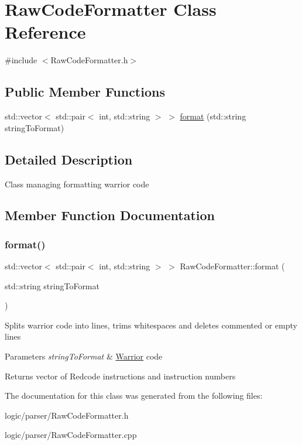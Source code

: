 \hypertarget{classRawCodeFormatter}{}\section{Raw\+Code\+Formatter Class Reference}
\label{classRawCodeFormatter}


{\ttfamily \#include $<$Raw\+Code\+Formatter.\+h$>$}

\subsection*{Public Member Functions}
\begin{DoxyCompactItemize}
\item 
std\+::vector$<$ std\+::pair$<$ int, std\+::string $>$ $>$ \hyperlink{classRawCodeFormatter_a6192c5bbd56a0ca5f06c5fa5f4ed34bc}{format} (std\+::string string\+To\+Format)
\end{DoxyCompactItemize}


\subsection{Detailed Description}
Class managing formatting warrior code 

\subsection{Member Function Documentation}
\mbox{\label{classRawCodeFormatter_a6192c5bbd56a0ca5f06c5fa5f4ed34bc}} 
\subsubsection{\texorpdfstring{format()}{format()}}
{\footnotesize\ttfamily std\+::vector$<$ std\+::pair$<$ int, std\+::string $>$ $>$ Raw\+Code\+Formatter\+::format (\begin{DoxyParamCaption}\item[{std\+::string}]{string\+To\+Format }\end{DoxyParamCaption})}

Splits warrior code into lines, trims whitespaces and deletes commented or empty lines 
\begin{DoxyParams}{Parameters}
{\em string\+To\+Format} & \hyperlink{classWarrior}{Warrior} code \\
\hline
\end{DoxyParams}
\begin{DoxyReturn}{Returns}
vector of Redcode instructions and instruction numbers 
\end{DoxyReturn}


The documentation for this class was generated from the following files\+:\begin{DoxyCompactItemize}
\item 
logic/parser/Raw\+Code\+Formatter.\+h\item 
logic/parser/Raw\+Code\+Formatter.\+cpp\end{DoxyCompactItemize}
